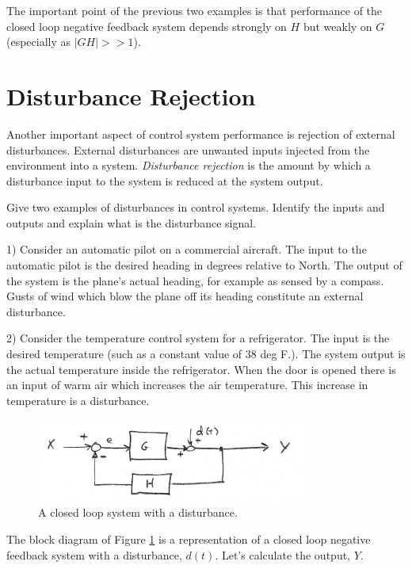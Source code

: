  The important point of the previous two examples is that performance of the closed loop negative feedback system depends strongly on $H$ but weakly on $G$ (especially as $|GH| >>1$).


\section{Disturbance Rejection}

Another important aspect of control system performance is rejection of external disturbances.  External disturbances are unwanted inputs injected from the environment into a system.   {\it Disturbance rejection} is the amount by which a disturbance input to the system is reduced at the system output.

\begin{ExampleSmall}
Give two examples of disturbances in control systems.  Identify the inputs and outputs and explain what is the disturbance signal.

1) Consider an automatic pilot on a commercial aircraft.  The input to the automatic pilot is the desired heading in degrees relative to North. The output of the system is the plane's actual heading, for example as sensed by a compass.   Gusts of wind which blow the plane off its heading constitute an external disturbance.

2) Consider the temperature control system for a refrigerator.  The input is the desired temperature (such as a constant value of 38 deg F.). The system output is the actual temperature inside the refrigerator.   When the door is opened there is an input of warm air which increases the air temperature.  This increase in temperature is   a disturbance.
\end{ExampleSmall}


\begin{figure}\centering
\includegraphics[width=3.5in]{figs06/00773a.png}
\caption{A closed loop system with a disturbance.}\label{DisturbanceLoop}
\end{figure}


The block diagram of Figure \ref{DisturbanceLoop} is a representation of a closed loop negative feedback system with a disturbance, $d(t)$.
Let's calculate the output, $Y$.

